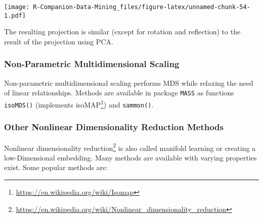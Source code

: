 \documentclass[
  notitlepage]{book}
\newenvironment{Shaded}{\begin{snugshade}}{\end{snugshade}}
\newcommand{\DataTypeTok}[1]{\textcolor[rgb]{0.13,0.29,0.53}{#1}}
\newcommand{\DecValTok}[1]{\textcolor[rgb]{0.00,0.00,0.81}{#1}}
\newcommand{\ErrorTok}[1]{\textcolor[rgb]{0.64,0.00,0.00}{\textbf{#1}}}
\newcommand{\KeywordTok}[1]{\textcolor[rgb]{0.13,0.29,0.53}{\textbf{#1}}}
\newcommand{\NormalTok}[1]{#1}
\newcommand{\OperatorTok}[1]{\textcolor[rgb]{0.81,0.36,0.00}{\textbf{#1}}}
\newcommand{\StringTok}[1]{\textcolor[rgb]{0.31,0.60,0.02}{#1}}
\DeclareRobustCommand{\href}[2]{#2\footnote{\url{#1}}}
\begin{document}
\begin{Shaded}
\end{Shaded}

\texttt{[image: R-Companion-Data-Mining\_files/figure-latex/unnamed-chunk-54-1.pdf]}

The resulting projection is similar (except for rotation and reflection)
to the result of the projection using PCA.

\hypertarget{non-parametric-multidimensional-scaling}{%
\subsubsection{Non-Parametric Multidimensional Scaling}\label{non-parametric-multidimensional-scaling}}

Non-parametric multidimensional scaling performs MDS while relaxing the
need of linear relationships. Methods are available in package \texttt{MASS} as
functions \texttt{isoMDS()} (implements \href{https://en.wikipedia.org/wiki/Isomap}{isoMAP}) and \texttt{sammon()}.

\hypertarget{other-nonlinear-dimensionality-reduction-methods}{%
\subsubsection{Other Nonlinear Dimensionality Reduction Methods}\label{other-nonlinear-dimensionality-reduction-methods}}

\href{https://en.wikipedia.org/wiki/Nonlinear_dimensionality_reduction}{Nonlinear dimensionality reduction}
is also called manifold learning or creating a low-Dimensional embedding.
Many methods are available with varying properties exist.
Some popular methods are:
\end{document}
